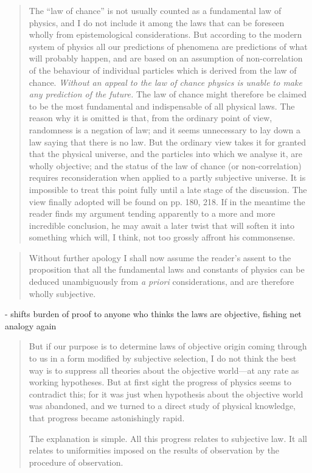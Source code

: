 \begin{quote}
    The ``law of chance'' is not usually counted as a fundamental law of physics, and I do not include it among the laws that can be foreseen wholly from epistemological considerations.  But according to the modern system of physics all our predictions of phenomena are predictions of what will probably happen, and are based on an assumption of non-correlation of the behaviour of individual particles which is derived from the law of chance.  \emph{Without an appeal to the law of chance physics is unable to make any prediction of the future.}  The law of chance might therefore be claimed to be the most fundamental and indispensable of all physical laws.  The reason why it is omitted is that, from the ordinary point of view, randomness is a negation of law; and it seems unnecessary to lay down a law saying that there is no law.  But the ordinary view takes it for granted that the physical universe, and the particles into which we analyse it, are wholly objective; and the status of the law of chance (or non-correlation) requires reconsideration when applied to a partly subjective universe.  It is impossible to treat this point fully until a late stage of the discussion.  The view finally adopted will be found on pp. 180, 218.  If in the meantime the reader finds my argument tending apparently to a more and more incredible conclusion, he may await a later twist that will soften it into something which will, I think, not too grossly affront his commonsense.
    
    \citep[p. 61]{Eddington1939}
\end{quote}

\begin{quote}
    Without further apology I shall now assume the reader's assent to the proposition that all the fundamental laws and constants of physics can be deduced unambiguously from \emph{a priori} considerations, and are therefore wholly subjective.  
    
    \citep[p. 62]{Eddington1939}
\end{quote}

- shifts burden of proof to anyone who thinks the laws are objective, fishing net analogy again

\begin{quote}
    But if our purpose is to determine laws of objective origin coming through to us in a form modified by subjective selection, I do not think the best way is to suppress all theories about the objective world---at any rate as working hypotheses.  But at first sight the progress of physics seems to contradict this; for it was just when hypothesis about the objective world was abandoned, and we turned to a direct study of physical knowledge, that progress became astonishingly rapid.
    
    The explanation is simple.  All this progress relates to subjective law.  It all relates to uniformities imposed on the results of observation by the procedure of observation.  
    
    \citep[p. 62]{Eddington1939}
\end{quote}

